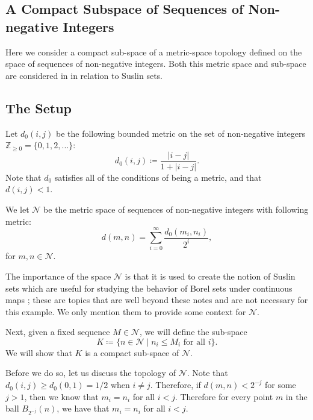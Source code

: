 \subsection{A Compact Subspace of Sequences of Non-negative Integers}

Here we consider a compact sub-space of a metric-space topology defined on the space of sequences of
non-negative integers. Both this metric space and sub-space are considered in \cite{federer} in relation to
Suslin sets. 

\subsection*{The Setup}

Let \(d_0(i, j)\) be the following bounded metric on the set of non-negative integers \(\mathbb Z_{\geq 0} = \{ 
0, 1, 2, ...\}\): 
\begin{equation}
d_0(i, j) \coloneqq \frac{|i -j|}{1 + |i - j|}.
\end{equation}
Note that \(d_0\) satisfies all of the conditions of being a metric, and that \(d(i, j) < 1\).

We let \(\mathcal N\) be the metric space of sequences of non-negative integers with following metric:
\begin{equation}
d(m, n) = \sum\limits_{i = 0}^\infty \frac{ d_0(m_i, n_i) } {2^i},
\end{equation}
for \(m, n \in \mathcal N\).

The importance of the space \(\mathcal N\) is that it is used to create the notion of Suslin sets which are
useful for studying the behavior of Borel sets under continuous maps \cite{federer}; these are topics
that are well beyond these notes and are not necessary for this example. We only mention them to provide
some context for \(\mathcal N\).

Next, given a fixed sequence \(M \in \mathcal N\), we will define the sub-space
\begin{equation}
K \coloneqq \{n \in \mathcal N \mid n_i \leq M_i \text{ for all } i\}.
\end{equation}
We will show that \(K\) is a compact sub-space of \(\mathcal N\).

Before we do so, let us discuss the topology of \(\mathcal N\). Note that \(d_0(i, j) \geq d_0(0, 1) = 1/2\)
when \(i \neq j\). Therefore, if \(d(m, n) < 2^{-j}\) for some \(j > 1\), then we know that \(m_i = n_i\)
for all \(i < j\). Therefore for every point \(m\) in the ball \(B_{2^{-j}}(n)\), we have that \(m_i = n_i\)
for all \(i  < j\).

